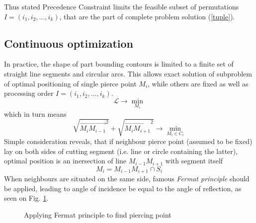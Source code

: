 \documentclass{ifacconf}
\begin{document}
Thus stated Precedence Constraint
limits the feasible subset of permutations
$I=(i_1, i_2, \dots, i_k)$,
that are the part of
complete problem solution (\ref{tuple}).

\subsection{Continuous optimization}
In practice,
the shape of part bounding contours
is limited to a finite set
of straight line segments and circular arcs.
This allows exact solution of
subproblem of optimal
positioning of single pierce point $M_i$,
while others are fixed as well as
processing order
$I=(i_1, i_2, \dots, i_k)$.
$$
\mathcal L \to \min_{M_i}
$$
which in turn means
$$
\sqrt{\overrightarrow{M_i M_{i-1}}^2} +
\sqrt{\overrightarrow{M_i M_{i+1}}^2} \to
\min_{M_i \in C_i}
$$
Simple consideration reveals,
that
if neighbour pierce
point (assumed to be fixed)
lay on both sides of cutting segment
(i.e. line or circle containing the latter),
optimal position is an
inersection of line $M_{i-1}M_{i+1}$
with segment itself
$$
M_i = M_{i-1}M_{i+1} \cap S_i
$$
When neighbours are situated
on the same side,
famous \textit{Fermat principle}
should be applied,
leading to
angle of incidence be equal to the angle of reflection,
as seen on Fig. \ref{fermat}.

\begin{figure}
  \begin{center}
  \caption{Applying Fermat principle to find piercing point} \label{fermat}
  \end{center}
\end{figure}
\end{document}

